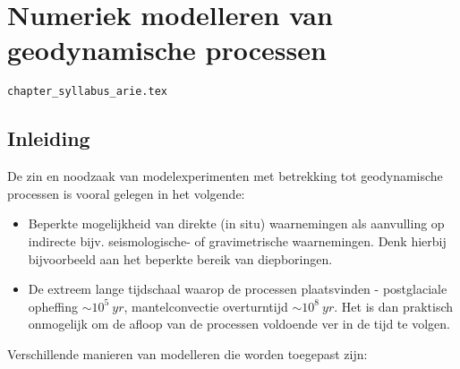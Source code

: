 \chapter{Numeriek modelleren van geodynamische processen} %

\begin{flushright} {\tiny {\color{gray} \tt chapter\_syllabus\_arie.tex}} \end{flushright}

\section{Inleiding}

De zin en noodzaak van modelexperimenten 
met betrekking tot geodynamische processen is vooral gelegen in het 
volgende:
\begin{itemize}
\item Beperkte mogelijkheid van direkte (in situ) waarnemingen 
als aanvulling op indirecte bijv. seismologische- of gravimetrische
waarnemingen.
Denk hierbij bijvoorbeeld aan het beperkte bereik van diepboringen.
\item De extreem lange tijdschaal waarop de processen plaatsvinden
 - postglaciale opheffing $\sim 10^5 \ yr$, mantelconvectie overturntijd
 $\sim 10^8 \ yr$.
Het is dan praktisch onmogelijk om de afloop van de processen 
voldoende ver in de tijd te volgen.
\end{itemize}

\noindent
Verschillende manieren van modelleren die worden toegepast zijn:

